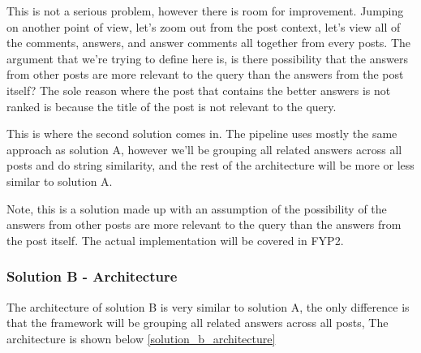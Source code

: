 This is not a serious problem, however there is room for improvement. Jumping on another point of view, let's zoom out from the post context, let's view all of the comments, answers, and answer comments all together from every posts. The argument that we're trying to define here is, is there possibility that the answers from other posts are more relevant to the query than the answers from the post itself? The sole reason where the post that contains the better answers is not ranked is because the title of the post is not relevant to the query.

This is where the second solution comes in. The pipeline uses mostly the same approach as solution A, however we'll be grouping all related answers across all posts and do string similarity, and the rest of the architecture will be more or less similar to solution A. 

Note, this is a solution made up with an assumption of the possibility of the answers from other posts are more relevant to the query than the answers from the post itself. The actual implementation will be covered in FYP2. 

\subsubsection{Solution B - Architecture}
The architecture of solution B is very similar to solution A, the only difference is that the framework will be grouping all related answers across all posts, The architecture is shown below \ref*{solution_b_architecture}

